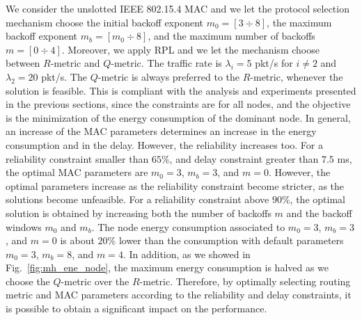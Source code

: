 \documentclass[review, 1p, 11pt]{elsarticle}
\numberwithin{equation}{section}
\begin{document}
We consider the unslotted IEEE
802.15.4 MAC and we let the protocol selection mechanism choose the
initial backoff exponent $m_{0}=[3\div8]$, the maximum backoff exponent
$m_{b}=[m_0\div8]$, and the maximum number of backoffs $m = [0\div4]$.
Moreover, we apply RPL and we let the mechanism choose between $R$-metric and $Q$-metric.
The traffic rate is $\lambda_i=5$ pkt/s for $i\neq2$ and $\lambda_2=20$ pkt/s.
The $Q$-metric is always preferred to the $R$-metric, whenever the solution is feasible.
This is compliant with the analysis and experiments presented in the previous sections,
since the constraints are for all nodes, and the objective is the minimization of the energy consumption
of the dominant node.
In general, an increase of the MAC parameters determines an increase in the energy consumption and in the delay.
However, the reliability increases too.
For a reliability constraint smaller than $65\%$, and delay constraint greater than $7.5$ ms,
the optimal MAC parameters are $m_{0}=3$, $m_{b}=3$, and
$m=0$.  However, the optimal parameters increase as the reliability constraint become stricter,  as the solutions become unfeasible.
For a reliability constraint above $90\%$,  the optimal solution is obtained by increasing both the number of backoffs $m$ and the backoff windows $m_{0}$ and $m_{b}$.
The node energy consumption associated to $m_{0}=3$, $m_{b}=3$, and
$m=0$ is about $20\%$ lower than the consumption with default parameters $m_{0}=3$, $m_{b}=8$, and $m=4$. In addition, as we showed in Fig.~\ref{fig:mh_ene_node}, the maximum energy consumption is halved as we choose the $Q$-metric over the $R$-metric.
Therefore, by optimally selecting routing metric and MAC parameters according to the reliability and delay constraints, it is possible to obtain a significant impact on the performance.
\end{document}
